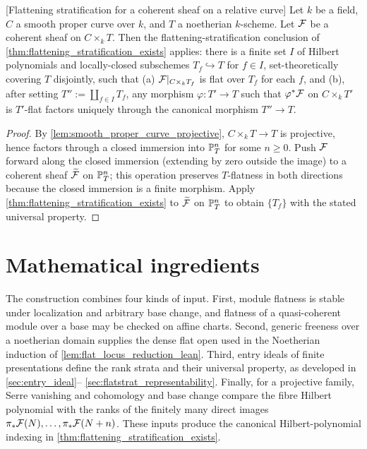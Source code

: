 \begin{corollary}

[Flattening stratification for a coherent sheaf on a relative curve]
  \label{cor:flattening_stratification_curve}
  Let \(k\) be a field, \(C\) a smooth proper curve over \(k\), and \(T\) a noetherian
  \(k\)-scheme.  Let \(\mathcal{F}\) be a coherent sheaf on \(C \times_k T\). Then the
  flattening-stratification conclusion of
  \cref{thm:flattening_stratification_exists} applies: there is a finite
  set \(I\) of Hilbert polynomials and locally-closed subschemes
  \(T_f \hookrightarrow T\) for \(f \in I\), set-theoretically covering \(T\)
  disjointly, such that (a) \(\mathcal{F}|_{C \times_k T_f}\) is flat over \(T_f\) for
  each \(f\), and (b), after setting \(T'':=\coprod_{f\in I}T_f\), any
  morphism \(\varphi : T' \to T\) such that \(\varphi^* \mathcal{F}\) on
  \(C \times_k T'\) is \(T'\)-flat factors uniquely through the canonical
  morphism \(T'' \to T\).
\end{corollary}

\begin{proof}
  By \cref{lem:smooth_proper_curve_projective}, \(C \times_k T \to T\) is
  projective, hence factors through a closed immersion into \(\mathbb{P}^n_T\) for some
  \(n \ge 0\).  Push \(\mathcal{F}\) forward along the closed immersion (extending by zero
  outside the image) to a coherent sheaf \(\widetilde{\mathcal{F}}\) on \(\mathbb{P}^n_T\); this
  operation preserves \(T\)-flatness in both directions because the closed
  immersion is a finite morphism.  Apply
  \cref{thm:flattening_stratification_exists} to \(\widetilde{\mathcal{F}}\) on
  \(\mathbb{P}^n_T\) to obtain \(\{T_f\}\) with the stated universal property.
\end{proof}

\section{Mathematical ingredients}
\label{sec:flatstrat_mathlib_status}

The construction combines four kinds of input.  First, module flatness is
stable under localization and arbitrary base change, and flatness of a
quasi-coherent module over a base may be checked on affine charts.  Second,
generic freeness over a noetherian domain supplies the dense flat open used
in the Noetherian induction of \cref{lem:flat_locus_reduction_lean}.  Third,
entry ideals of finite presentations define the rank strata and their
universal property, as developed in \cref{sec:entry_ideal}--
\cref{sec:flatstrat_representability}.  Finally, for a projective family,
Serre vanishing and cohomology and base change compare the fibre Hilbert
polynomial with the ranks of the finitely many direct images
\(\pi_*\mathcal{F}(N),\ldots,\pi_*\mathcal{F}(N+n)\).  These inputs produce the canonical
Hilbert-polynomial indexing in
\cref{thm:flattening_stratification_exists}.

